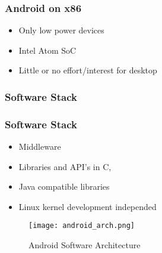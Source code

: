 \begin{frame}
	\frametitle{Android on x86}
	\begin{itemize}
		\item Only low power devices \pause
		\item Intel Atom SoC\pause
		\item Little or no effort/interest for desktop \pause
	\end{itemize}

\end{frame}

\subsubsection{Software Stack}


\begin{frame}
	\frametitle{Software Stack}
	\begin{itemize}
		\item Middleware
		\item Libraries and API's in C,
		\item Java compatible libraries
		\item Linux kernel development independed
	\end{itemize}

\end{frame}

\begin {frame}
\begin{figure}[h]
  \centering
    \centering
    \texttt{[image: android\_arch.png]}
    \caption{Android Software Architecture}
    \label{fig:android_arch}
\end{figure}
\end{frame}



  
  

